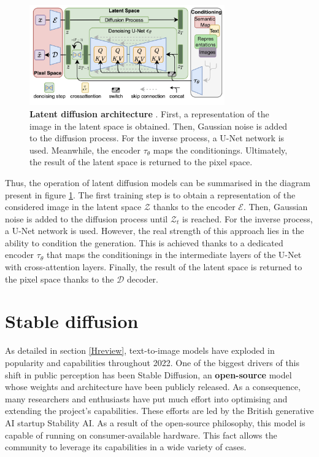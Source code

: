 \begin{figure}
    \centering
    \includegraphics[width=0.75\textwidth]{Pictures/LDMDiagram.png} 
    \caption{\textbf{Latent diffusion architecture} \cite{rombach2022high}. First, a representation of the image in the latent space is obtained. Then, Gaussian noise is added to the diffusion process. For the inverse process, a U-Net network is used. Meanwhile, the encoder $\tau_\theta$ maps the conditionings. Ultimately, the result of the latent space is returned to the pixel space.}
    \label{fig:LDMDiagram}
\end{figure}

Thus, the operation of latent diffusion models can be summarised in the diagram present in figure \ref{fig:LDMDiagram}. The first training step is to obtain a representation of the considered image in the latent space $\mathcal{Z}$ thanks to the encoder  $\mathcal{E}$. Then, Gaussian noise is added to the diffusion process until $\mathcal{Z}_t$ is reached. For the inverse process, a U-Net network is used. However, the real strength of this approach lies in the ability to condition the generation. This is achieved thanks to a dedicated encoder $\tau_\theta$ that maps the conditionings in the intermediate layers of the U-Net with cross-attention layers. Finally, the result of the latent space is returned to the pixel space thanks to the $\mathcal{D}$ decoder.

\section{Stable diffusion} \label{SD}

As detailed in section \ref{Hreview}, text-to-image models have exploded in popularity and capabilities throughout 2022. One of the biggest drivers of this shift in public perception has been Stable Diffusion, an \textbf{open-source} model whose weights and architecture have been publicly released. As a consequence, many researchers and enthusiasts have put much effort into optimising and extending the project's capabilities. These efforts are led by the British generative AI startup Stability AI. As a result of the open-source philosophy, this model is capable of running on consumer-available hardware. This fact allows the community to leverage its capabilities in a wide variety of cases.

